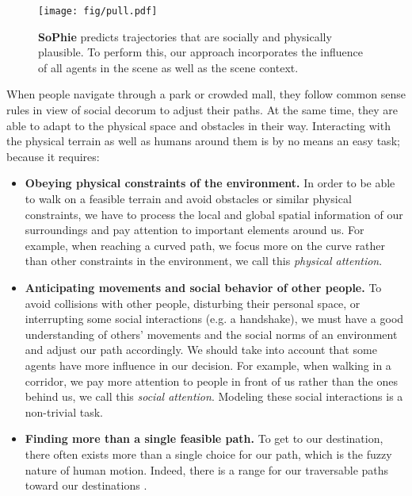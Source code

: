 \documentclass[10pt,twocolumn,letterpaper]{article}
\begin{document}
\begin{figure}[t]
  \centering
    \texttt{[image: fig/pull.pdf]}
	\caption{\small \textbf{SoPhie} predicts trajectories that are socially and physically plausible. To perform this, our approach incorporates the influence of all agents in the scene as well as the scene context.}
	\label{fig:overview}
\end{figure}

When people navigate through a park or crowded mall, they follow common sense rules in view of social decorum to adjust their paths. At the same time, they are able to adapt to the physical space and obstacles in their way. Interacting with the physical terrain as well as humans around them is by no means an easy task; because it requires:

\begin{itemize}[leftmargin=*]
\item \textbf{Obeying physical constraints of the environment.} In order to be able to walk on a feasible terrain and avoid obstacles or similar physical constraints, we have to process the local and global spatial information of our surroundings and pay attention to important elements around us. For example, when reaching a curved path, we focus more on the curve rather than other constraints in the environment, we call this \textit{physical attention}.
\item \textbf{Anticipating movements and social behavior of other people.} To avoid collisions with other people, disturbing their personal space, or interrupting some social interactions (e.g. a handshake), we must have a good understanding of others' movements and the social norms of an environment and adjust our path accordingly. We should take into account that some agents have more influence in our decision. For example, when walking in a corridor, we pay more attention to people in front of us rather than the ones behind us, we call this \textit{social attention}. Modeling these social interactions is a non-trivial task.
\item \textbf{Finding more than a single feasible path.} To get to our destination, there often exists more than a single choice for our path, which is the fuzzy nature of human motion. Indeed, there is a range for our traversable paths toward our destinations
\cite{robicquet2016learning,kitani2012activity,gupta2018social,alahi2016social}.

\end{itemize}
\end{document}
